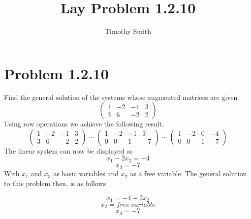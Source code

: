 \documentclass{article}
\begin{document}
\author{Timothy Smith}
\title{Lay Problem 1.2.10 }
\maketitle

\section*{Problem 1.2.10}
Find the general solution of the systems whose augmented matrices are given
\[
\begin{pmatrix} 
1 & -2 & -1 & 3 \\
3& 6 &-2 &2
\end{pmatrix}
\]
Using row operations we achieve the following result. 
\[
\begin{pmatrix} 
1 & -2 & -1 & 3 \\
3& 6 &-2 &2
\end{pmatrix}
\sim
\begin{pmatrix} 
1 & -2 & -1 & 3 \\
0& 0 &1 &-7
\end{pmatrix}
\sim
\begin{pmatrix} 
1 & -2 & 0 & -4 \\
0& 0 &1 &-7
\end{pmatrix}
\]
The linear system can now be displayed as
$$
x_1-2x_2=-4
$$
$$
x_3=-7
$$
With $x_1$ and $ x_3$ as basic variables and $x_2 $ as a free variable. 
The general solution to this problem then, is as follows

 $$
 x_1=-4+2x_2 
 $$
\begin{equation*}
x_2= free\ variable
\end{equation*}
$$
  x_3 =-7 
$$
\end{document}
